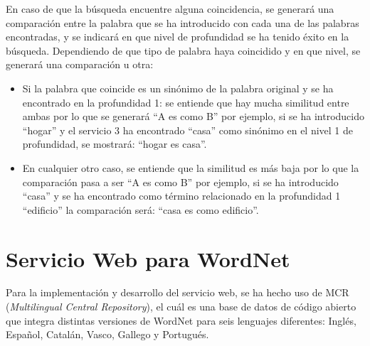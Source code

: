 En caso de que la búsqueda encuentre alguna coincidencia, se generará una comparación entre la palabra que se ha introducido con cada una de las palabras encontradas, y se indicará en que nivel de profundidad se ha tenido éxito en la búsqueda. Dependiendo de que tipo de palabra haya coincidido y en que nivel, se generará una comparación u otra:
\begin{itemize}
	\item Si la palabra que coincide es un sinónimo de la palabra original  y se ha encontrado en la profundidad 1: se entiende que hay mucha similitud entre ambas por lo que se generará ``A es como B'' por ejemplo, si se ha introducido ``hogar'' y el servicio 3 ha encontrado ``casa'' como sinónimo en el nivel 1 de profundidad, se mostrará: ``hogar es casa''.
	
	\item En cualquier otro caso, se entiende que la similitud es más baja por lo que la comparación pasa a ser ``A es como B'' por ejemplo, si se ha introducido ``casa'' y se ha encontrado como término relacionado en la profundidad 1 ``edificio'' la comparación será: ``casa es como edificio''.
\end{itemize}


\section{Servicio Web para WordNet}
\label{cap:sec:servicioWordnet}

Para la implementación y desarrollo del servicio web, se ha hecho uso de MCR (\textit{Multilingual Central Repository}), el cuál es una base de datos de código abierto que integra distintas versiones de WordNet para seis lenguajes diferentes: Inglés, Español, Catalán, Vasco, Gallego y Portugués. 